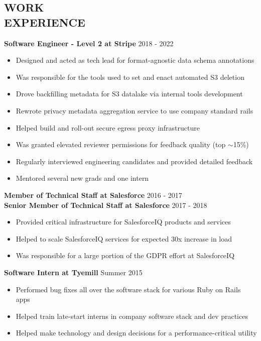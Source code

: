 \documentclass[line,margin]{res}
\begin{document}
\begin{resume}
\section{\textcolor{HeaderColor}{WORK \\ EXPERIENCE}}
	      {\sc \textbf{Software Engineer - Level 2 at Stripe}} \hfill 2018 - 2022
                 \begin{itemize}  \itemsep -2pt %
                 \item Designed and acted as tech lead for format-agnostic data schema annotations
                 \item Was responsible for the tools used to set and enact automated S3 deletion
                 \item Drove backfilling metadata for S3 datalake via internal tools development
	             \item Rewrote privacy metadata aggregation service to use company standard rails
                 \item Helped build and roll-out secure egress proxy infrastructure
                 \item Was granted elevated reviewer permissions for feedback quality (top $\sim$15\%)
                 \item Regularly interviewed engineering candidates and provided detailed feedback
                 \item Mentored several new grads and one intern
                 \end{itemize}

	      {\sc \textbf{Member of Technical Staff at Salesforce}} \hfill 2016 - 2017 \\
	      {\sc \textbf{Senior Member of Technical Staff at Salesforce}} \hfill 2017 - 2018
                 \begin{itemize}  \itemsep -2pt %
	             \item Provided critical infrastructure for SalesforceIQ products and services
                 \item Helped to scale SalesforceIQ services for expected 30x increase in load
                 \item Was responsible for a large portion of the GDPR effort at SalesforceIQ
                 \end{itemize}

                {\sc \textbf{Software Intern at Tyemill}} \hfill Summer 2015
                 \begin{itemize}  \itemsep -2pt %
                 \item Performed bug fixes all over the software stack for various Ruby on Rails apps
                 \item Helped train late-start interns in company software stack and dev practices
                 \item Helped make technology and design decisions for a performance-critical utility
                 \end{itemize}


\end{resume}
\end{document}
